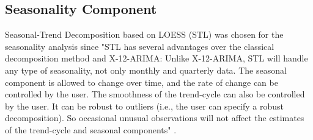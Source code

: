 \documentclass[conference]{IEEEtran}
\begin{document}
\subsection{Seasonality Component}
Seasonal-Trend Decomposition based on LOESS (STL) \cite{STL} was chosen for the seasonality analysis since "STL has several advantages over the classical decomposition method and X-12-ARIMA: Unlike X-12-ARIMA, STL will handle any type of seasonality, not only monthly and quarterly data. 
The seasonal component is allowed to change over time, and the rate of change can be controlled by the user. 
The smoothness of the trend-cycle can also be controlled by the user. It can be robust to outliers (i.e., the user can specify a robust decomposition). 
So occasional unusual observations will not affect the estimates of the trend-cycle and seasonal components" \cite{forecasting}.\\
\end{document}
